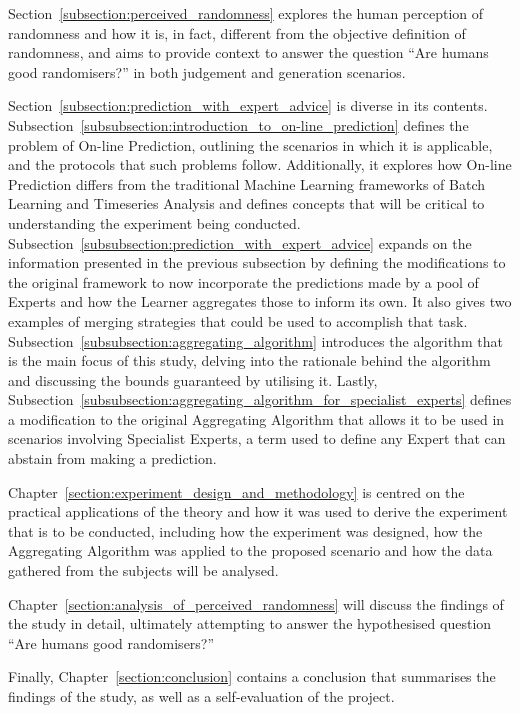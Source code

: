 Section~\ref{subsection:perceived_randomness} explores the human perception of randomness and how it is, in fact, different from the objective definition of randomness, and aims to provide context to answer the question ``Are humans good randomisers?'' in both judgement and generation scenarios.

Section~\ref{subsection:prediction_with_expert_advice} is diverse in its contents. Subsection~\ref{subsubsection:introduction_to_on-line_prediction} defines the problem of On-line Prediction, outlining the scenarios in which it is applicable, and the protocols that such problems follow. Additionally, it explores how On-line Prediction differs from the traditional Machine Learning frameworks of Batch Learning and Timeseries Analysis and defines concepts that will be critical to understanding the experiment being conducted. Subsection~\ref{subsubsection:prediction_with_expert_advice} expands on the information presented in the previous subsection by defining the modifications to the original framework to now incorporate the predictions made by a pool of Experts and how the Learner aggregates those to inform its own. It also gives two examples of merging strategies that could be used to accomplish that task. Subsection~\ref{subsubsection:aggregating_algorithm} introduces the algorithm that is the main focus of this study, delving into the rationale behind the algorithm and discussing the bounds guaranteed by utilising it. Lastly, Subsection~\ref{subsubsection:aggregating_algorithm_for_specialist_experts} defines a modification to the original Aggregating Algorithm that allows it to be used in scenarios involving Specialist Experts, a term used to define any Expert that can abstain from making a prediction.

Chapter~\ref{section:experiment_design_and_methodology} is centred on the practical applications of the theory and how it was used to derive the experiment that is to be conducted, including how the experiment was designed, how the Aggregating Algorithm was applied to the proposed scenario and how the data gathered from the subjects will be analysed.

Chapter~\ref{section:analysis_of_perceived_randomness} will discuss the findings of the study in detail, ultimately attempting to answer the hypothesised  question ``Are humans good randomisers?''

Finally, Chapter~\ref{section:conclusion} contains a conclusion that summarises the findings of the study, as well as a self-evaluation of the project.
